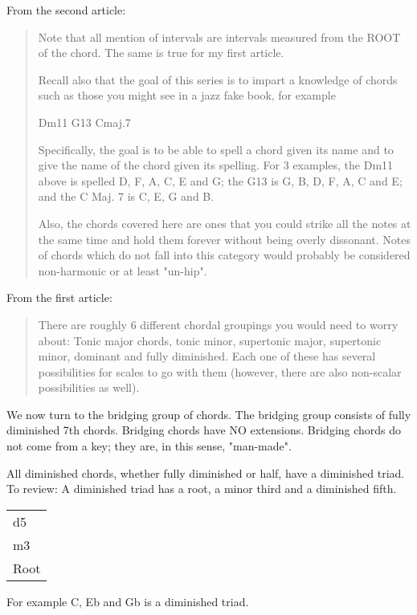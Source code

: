 From the second article:
\begin{quote}
Note that all mention of intervals are intervals measured from the ROOT
of the chord. The same is true for my first article.

Recall also that the goal of this series is to impart a knowledge of
chords such as those you might see in a jazz fake book, for example

Dm11     G13     Cmaj.7

Specifically, the goal is to be able to spell a chord given its name and
to give the name of the chord given its spelling. For 3 examples, the
Dm11 above is spelled D, F, A, C, E and G; the G13 is G, B, D, F, A, C
and E; and the C Maj. 7 is C, E, G and B.

Also, the chords covered here are ones that you could strike all the
notes at the same time and hold them forever without being overly
dissonant. Notes of chords which do not fall into this category would
probably be considered non-harmonic or at least "un-hip".
\end{quote}

From the first article:
\begin{quote}
There are roughly 6 different chordal groupings you would need to worry about:
Tonic major chords, tonic minor, supertonic major, supertonic minor, dominant
and fully diminished. Each one of these has several possibilities for scales
to go with them (however, there are also non-scalar possibilities as well).
\end{quote}

We now turn to the bridging group of chords. The bridging group consists of
fully diminished 7th chords. Bridging chords have NO extensions. Bridging
chords do not come from a key; they are, in this sense, "man-made".

All diminished chords, whether fully diminished or half, have a diminished
triad. To review: A diminished triad has a root, a minor third and a diminished
fifth.

\begin{center}
\begin{tabular}{ | l | }
  \hline
  d5\\
  m3\\
  Root\\
  \hline
\end{tabular}
\end{center}

For example C, Eb and Gb is a diminished triad.

